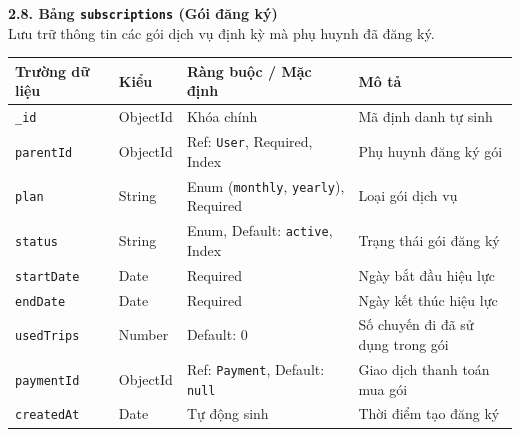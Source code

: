 \documentclass[../DoAn.tex]{subfiles}
\begin{document}
\textbf{2.8. Bảng \texttt{subscriptions} (Gói đăng ký)} \\
Lưu trữ thông tin các gói dịch vụ định kỳ mà phụ huynh đã đăng ký.
\begin{table}[H]
    \centering
    \begin{tabular}{|l|l|p{4cm}|p{5cm}|}
        \hline
        \textbf{Trường dữ liệu} & \textbf{Kiểu} & \textbf{Ràng buộc / Mặc định}                      & \textbf{Mô tả}                    \\ \hline
        \texttt{\_id}           & ObjectId      & Khóa chính                                         & Mã định danh tự sinh              \\ \hline
        \texttt{parentId}       & ObjectId      & Ref: \texttt{User}, Required, Index                & Phụ huynh đăng ký gói             \\ \hline
        \texttt{plan}           & String        & Enum (\texttt{monthly}, \texttt{yearly}), Required & Loại gói dịch vụ                  \\ \hline
        \texttt{status}         & String        & Enum, Default: \texttt{active}, Index              & Trạng thái gói đăng ký            \\ \hline
        \texttt{startDate}      & Date          & Required                                           & Ngày bắt đầu hiệu lực             \\ \hline
        \texttt{endDate}        & Date          & Required                                           & Ngày kết thúc hiệu lực            \\ \hline
        \texttt{usedTrips}      & Number        & Default: 0                                         & Số chuyến đi đã sử dụng trong gói \\ \hline
        \texttt{paymentId}      & ObjectId      & Ref: \texttt{Payment}, Default: \texttt{null}      & Giao dịch thanh toán mua gói      \\ \hline
        \texttt{createdAt}      & Date          & Tự động sinh                                       & Thời điểm tạo đăng ký             \\ \hline
    \end{tabular}
\end{table}
\end{document}

